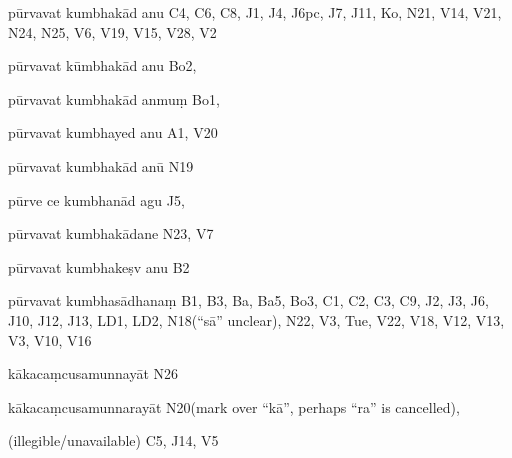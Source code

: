 \begin{ekdosis}
\begin{marma}[hp01_055]
\begin{marma}[hp02_009]
\begin{marma}[hp02_011]
\begin{marma}[hp02_57a]
\begin{description}
        \end{description}
      \end{marma}

      \begin{marma}[hp02_58b]
      \item[pūrvavat kumbhakād anu] C4, C6, C8, J1, J4, J6pc, J7, J11, Ko, N21, V14, V21,  N24, N25, V6, V19, V15, V28, V2
      \item[pūrvavat kūmbhakād anu] Bo2,
      \item[pūrvavat kumbhakād anmuṃ] Bo1,
      \item[pūrvavat kumbhayed anu] A1, V20
      \item[pūrvavat kumbhakād anū] N19
      \item[pūrve ce kumbhanād agu] J5,
      \item[pūrvavat kumbhakādane] N23, V7
      \item[pūrvavat kumbhakeṣv anu] B2
      \item[pūrvavat kumbhasādhanaṃ] B1, B3, Ba, Ba5, Bo3, C1, C2, C3, C9, J2, J3, J6, J10, J12, J13, LD1, LD2, N18(“sā” unclear), N22, V3, Tue, V22, V18, V12, V13, V3, V10, V16
      \item[kākacaṃcusamunnayāt] N26
      \item[kākacaṃcusamunnarayāt] N20(mark over “kā”, perhaps “ra” is cancelled), 
      \item[(illegible/unavailable)] C5, J14, V5
        \begin{description}

        \end{description}
      \end{marma}



\end{marma}
\end{marma}
\end{marma}
\end{ekdosis}
